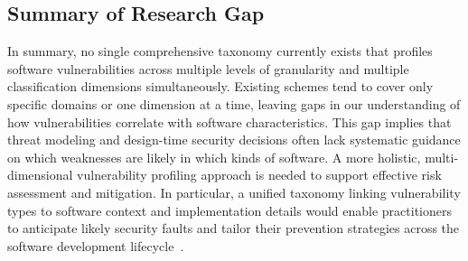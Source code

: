 \subsection{Summary of Research Gap}
In summary, no single comprehensive taxonomy currently exists that profiles software vulnerabilities across multiple levels of granularity and multiple classification dimensions simultaneously.  Existing schemes tend to cover only specific domains or one dimension at a time, leaving gaps in our understanding of how vulnerabilities correlate with software characteristics.  This gap implies that threat modeling and design-time security decisions often lack systematic guidance on which weaknesses are likely in which kinds of software. A more holistic, multi-dimensional vulnerability profiling approach is needed to support effective risk assessment and mitigation. In particular, a unified taxonomy linking vulnerability types to software context and implementation details would enable practitioners to anticipate likely security faults and tailor their prevention strategies across the software development lifecycle~\cite{Joshi2015ARO}.
